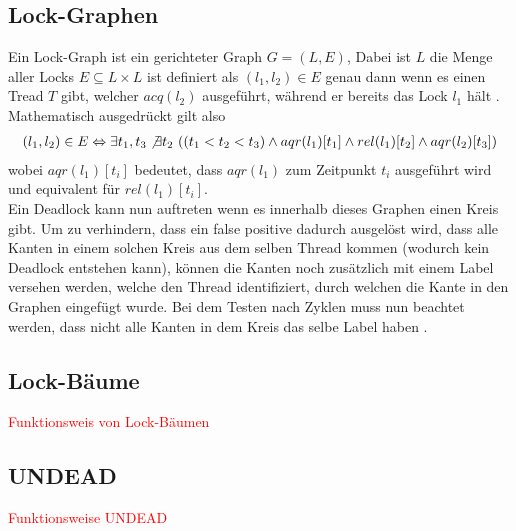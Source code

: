 \subsection{Lock-Graphen}
Ein Lock-Graph ist ein gerichteter Graph $G = (L, E)$, Dabei ist $L$ die Menge aller Locks $E \subseteq L \times L$ ist definiert als $(l_1, l_2) \in E$ genau dann wenn es einen Tread $T$ gibt, welcher $acq(l_2)$ ausgeführt, während er bereits das Lock $l_1$ hält \cite{bensalem}. Mathematisch ausgedrückt gilt also 
\begin{align*}
    (l_1, l_2) \in E \Leftrightarrow \exists t_1, t_3 \not\exists t_2\ ((t_1 < t_2 < t_3) \land aqr(l_1)[t_1] \land rel(l_1)[t_2] \land  aqr(l_2)[t_3])
\end{align*}
wobei $aqr(l_1)[t_i]$ bedeutet, dass $aqr(l_1)$ zum Zeitpunkt $t_i$ ausgeführt wird und equivalent für $rel(l_1)[t_i]$.\\
Ein Deadlock kann nun auftreten wenn es innerhalb dieses Graphen einen Kreis gibt. Um zu verhindern, dass ein false positive dadurch ausgelöst wird, dass alle Kanten in einem solchen Kreis aus dem selben Thread kommen (wodurch kein Deadlock entstehen kann), können die Kanten noch zusätzlich mit einem Label versehen werden, welche den Thread identifiziert, durch welchen die Kante in den Graphen eingefügt wurde. Bei dem Testen nach Zyklen muss nun beachtet werden, dass nicht alle Kanten in dem Kreis das selbe Label haben \cite{bensalem}. 
\subsection{Lock-Bäume}
\textcolor{red}{Funktionsweis von Lock-Bäumen}

\subsection{UNDEAD}
\textcolor{red}{Funktionsweise UNDEAD}
